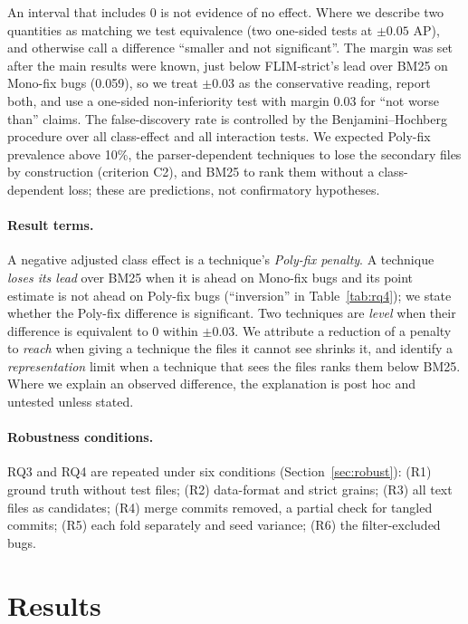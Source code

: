 \documentclass[a4paper,fleqn]{cas-dc}
\begin{document}
An interval that includes 0 is not evidence of no effect. Where we describe
two quantities as matching we test equivalence (two one-sided tests at
$\pm0.05$ AP), and otherwise call a difference ``smaller and not significant''.
The margin was set after the main results were known, just below
FLIM-strict's lead over BM25 on Mono-fix bugs (0.059), so we treat $\pm0.03$
as the conservative reading, report both, and use a one-sided
non-inferiority test with margin 0.03 for ``not worse than'' claims. The
false-discovery rate is controlled by the Benjamini--Hochberg procedure over
all class-effect and all interaction tests. We expected Poly-fix prevalence
above 10\%, the parser-dependent techniques to lose the secondary files by
construction (criterion C2), and BM25 to rank them without a class-dependent
loss; these are predictions, not confirmatory hypotheses.

\paragraph{Result terms.} A negative adjusted class effect is a technique's
\emph{Poly-fix penalty}. A technique \emph{loses its lead} over BM25 when it
is ahead on Mono-fix bugs and its point estimate is not ahead on Poly-fix bugs
(``inversion'' in Table~\ref{tab:rq4}); we state whether the Poly-fix
difference is significant. Two techniques are \emph{level} when their
difference is equivalent to 0 within $\pm0.03$. We attribute a reduction of a
penalty to \emph{reach} when giving a technique the files it cannot see
shrinks it, and identify a \emph{representation} limit when a technique that
sees the files ranks them below BM25. Where we explain an observed difference,
the explanation is post hoc and untested unless stated.

\paragraph{Robustness conditions.} RQ3 and RQ4 are repeated under six
conditions (Section~\ref{sec:robust}): (R1) ground truth without test files;
(R2) data-format and strict grains; (R3) all text files as candidates; (R4)
merge commits removed, a partial check for tangled commits; (R5) each fold
separately and seed variance; (R6) the filter-excluded bugs.

\section{Results}\label{sec:results}
\end{document}
